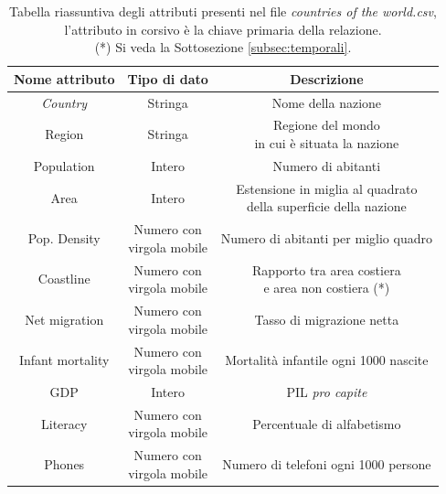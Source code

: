 \begin{table}
	\caption{Tabella riassuntiva degli attributi presenti nel file \textit{countries of the world.csv}, l'attributo in corsivo è la chiave primaria della relazione.\\(*) Si veda la Sottosezione \ref{subsec:temporali}.}

	\label{tab:world_countires_att}

	\centering
	\begin{tabular}{|c|c|c|}
		\hline
		\textbf{Nome attributo} & \textbf{Tipo di dato} & \textbf{Descrizione} \\ 
		\hline  
		\rule{0pt}{13pt}\emph{Country} & Stringa & Nome della nazione \\ 
		\hline  
		\rule{0pt}{24pt}Region & Stringa & \shortstack{Regione del mondo \\ in cui è situata la nazione} \\ 
		\hline  
		\rule{0pt}{13pt}Population & Intero & Numero di abitanti \\ 
		\hline  
		\rule{0pt}{24pt}Area & Intero & \shortstack{Estensione in miglia al quadrato \\ della superficie della nazione} \\
		\hline   
		\rule{0pt}{24pt}Pop. Density & \shortstack{Numero con \\ virgola mobile} & Numero di abitanti per miglio quadro \\ 
		\hline   
		\rule{0pt}{24pt}Coastline & \shortstack{Numero con \\ virgola mobile} & \shortstack{Rapporto tra area costiera \\ e area non costiera (*)} \\ 
		\hline   
		\rule{0pt}{24pt}Net migration & \shortstack{Numero con \\ virgola mobile} & Tasso di migrazione netta \\ 
		\hline  
		\rule{0pt}{24pt}Infant mortality & \shortstack{Numero con \\ virgola mobile} & Mortalità infantile ogni 1000 nascite \\ 
		\hline  
		\rule{0pt}{13pt}GDP & Intero & PIL \textit{pro capite} \\ 
		\hline  
		\rule{0pt}{24pt}Literacy & \shortstack{Numero con \\ virgola mobile} & Percentuale di alfabetismo \\ 
		\hline  
		\rule{0pt}{24pt}Phones & \shortstack{Numero con \\ virgola mobile} & Numero di telefoni ogni 1000 persone \\ 

\end{tabular}
\end{table}
